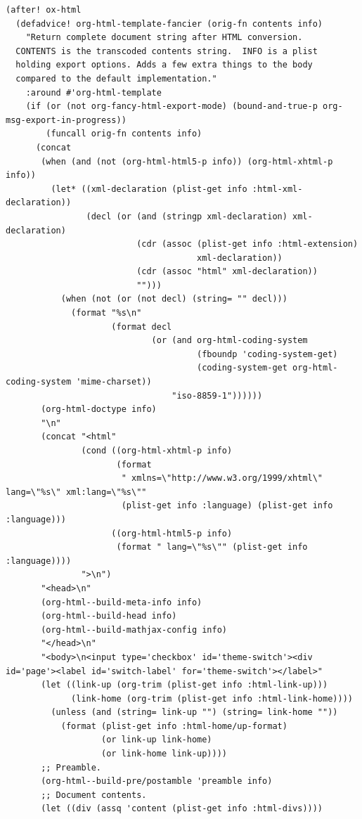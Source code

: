 \documentclass[11pt]{article}
\begin{document}
\begin{verbatim}
(after! ox-html
  (defadvice! org-html-template-fancier (orig-fn contents info)
    "Return complete document string after HTML conversion.
  CONTENTS is the transcoded contents string.  INFO is a plist
  holding export options. Adds a few extra things to the body
  compared to the default implementation."
    :around #'org-html-template
    (if (or (not org-fancy-html-export-mode) (bound-and-true-p org-msg-export-in-progress))
        (funcall orig-fn contents info)
      (concat
       (when (and (not (org-html-html5-p info)) (org-html-xhtml-p info))
         (let* ((xml-declaration (plist-get info :html-xml-declaration))
                (decl (or (and (stringp xml-declaration) xml-declaration)
                          (cdr (assoc (plist-get info :html-extension)
                                      xml-declaration))
                          (cdr (assoc "html" xml-declaration))
                          "")))
           (when (not (or (not decl) (string= "" decl)))
             (format "%s\n"
                     (format decl
                             (or (and org-html-coding-system
                                      (fboundp 'coding-system-get)
                                      (coding-system-get org-html-coding-system 'mime-charset))
                                 "iso-8859-1"))))))
       (org-html-doctype info)
       "\n"
       (concat "<html"
               (cond ((org-html-xhtml-p info)
                      (format
                       " xmlns=\"http://www.w3.org/1999/xhtml\" lang=\"%s\" xml:lang=\"%s\""
                       (plist-get info :language) (plist-get info :language)))
                     ((org-html-html5-p info)
                      (format " lang=\"%s\"" (plist-get info :language))))
               ">\n")
       "<head>\n"
       (org-html--build-meta-info info)
       (org-html--build-head info)
       (org-html--build-mathjax-config info)
       "</head>\n"
       "<body>\n<input type='checkbox' id='theme-switch'><div id='page'><label id='switch-label' for='theme-switch'></label>"
       (let ((link-up (org-trim (plist-get info :html-link-up)))
             (link-home (org-trim (plist-get info :html-link-home))))
         (unless (and (string= link-up "") (string= link-home ""))
           (format (plist-get info :html-home/up-format)
                   (or link-up link-home)
                   (or link-home link-up))))
       ;; Preamble.
       (org-html--build-pre/postamble 'preamble info)
       ;; Document contents.
       (let ((div (assq 'content (plist-get info :html-divs))))

\end{verbatim}
\end{document}
